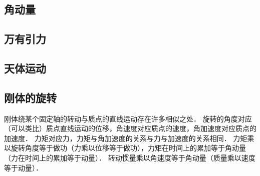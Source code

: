 \subsection{角动量}

\subsection{万有引力}

\subsection{天体运动}

\subsection{刚体的旋转}
刚体绕某个固定轴的转动与质点的直线运动存在许多相似之处． 旋转的角度对应（可以类比）质点直线运动的位移，角速度对应质点的速度，角加速度对应质点的加速度． 力矩对应力，力矩与角加速度的关系与力与加速度的关系相同． 力矩乘以旋转角度等于做功（力乘以位移等于做功），力矩在时间上的累加等于角动量（力在时间上的累加等于动量）． 转动惯量乘以角速度等于角动量（质量乘以速度等于动量）．
